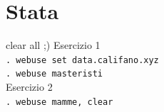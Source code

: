 \documentclass{beamer}
\begin{document}
\section{Stata}
\begin{frame}{clear all ;)}
    Esercizio 1 \\
    \texttt{. webuse set data.califano.xyz} \\
    \texttt{. webuse masteristi} \\
    \vspace{1em}
    Esercizio 2 \\
    \texttt{. webuse mamme, clear}
\end{frame}
\end{document}
